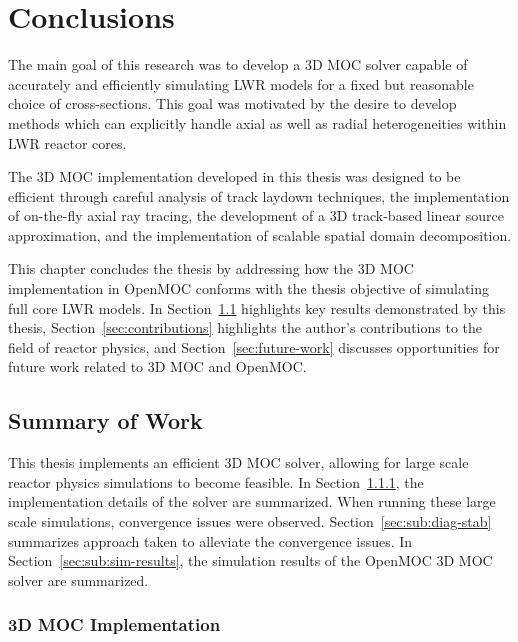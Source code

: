 \chapter{Conclusions}
\label{chap:conclusions}

The main goal of this research was to develop a 3D \ac{MOC} solver capable of accurately and efficiently simulating \ac{LWR} models for a fixed but reasonable choice of cross-sections. This goal was motivated by the desire to develop methods which can explicitly handle axial as well as radial heterogeneities within \ac{LWR} reactor cores. 

The 3D \ac{MOC} implementation developed in this thesis was designed to be efficient through careful analysis of track laydown techniques, the implementation of on-the-fly axial ray tracing, the development of a 3D track-based linear source approximation, and the implementation of scalable spatial domain decomposition.

This chapter concludes the thesis by addressing how the 3D \ac{MOC} implementation in OpenMOC conforms with the thesis objective of simulating full core \ac{LWR} models. In Section~\ref{sec:work-summary} highlights key results demonstrated by this thesis, Section~\ref{sec:contributions} highlights the author's contributions to the field of reactor physics, and Section~\ref{sec:future-work} discusses opportunities for future work related to 3D \ac{MOC} and OpenMOC.


\section{Summary of Work}
\label{sec:work-summary}

This thesis implements an efficient 3D \ac{MOC} solver, allowing for large scale reactor physics simulations to become feasible. In Section~\ref{sec:sub:3dmoc-imp}, the implementation details of the solver are summarized. When running these large scale simulations, convergence issues were observed. Section~\ref{sec:sub:diag-stab} summarizes approach taken to alleviate the convergence issues. In Section~\ref{sec:sub:sim-results}, the simulation results of the OpenMOC 3D \ac{MOC} solver are summarized.

\subsection{3D MOC Implementation}
\label{sec:sub:3dmoc-imp}

